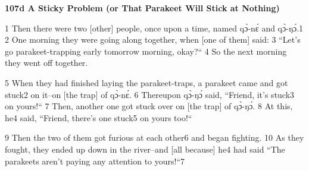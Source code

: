 
\textbf{107d A Sticky Problem (or That Parakeet Will Stick at Nothing)}

1 Then there were two [other] people, once upon a time, named qɔ̀-nɛ́ and qɔ̀-ŋɔ́.1
2 One morning they were going along together, when [one of them] said: 3 ``Let's
go parakeet-trapping early tomorrow morning, okay?`` 4 So the next morning
they went off together.

5 When they had finished laying the parakeet-traps, a parakeet came and got stuck2
on it--on [the trap] of qɔ̀-nɛ́. 6 Thereupon qɔ̀-ŋɔ́ said, ``Friend,
it's stuck3 on yours!`` 7 Then, another one got stuck over on [the trap]
of qɔ̀-ŋɔ́. 8 At this, he4 said, ``Friend, there's one stuck5 on yours
too!``

9 Then the two of them got furious at each other6 and began fighting. 10 As they
fought, they ended up down in the river--and [all because] he4 had said ``The
parakeets aren't paying any attention to yours!``7

